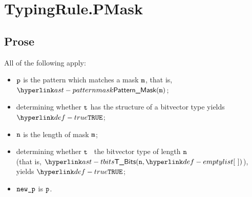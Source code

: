 \begin{mathpar}
\end{mathpar}


\section{TypingRule.PMask \label{sec:TypingRule.PMask}}

\subsection{Prose}
All of the following apply:
  \begin{itemize}
  \item $\vp$ is the pattern which matches a mask $\vm$, that is, $\PatternMask(\vm)$;
  \item determining whether $\vt$ has the structure of a bitvector type yields $\True$\ProseOrTypeError;
  \item $\vn$ is the length of mask $\vm$;
  \item determining whether $\vt$ \typesatisfies\ the bitvector type of length $\vn$ \\
        (that is, $\TBits(\vn, \emptylist)$), yields $\True$\ProseOrTypeError;
  \item $\newp$ is $\vp$.
\end{itemize}


